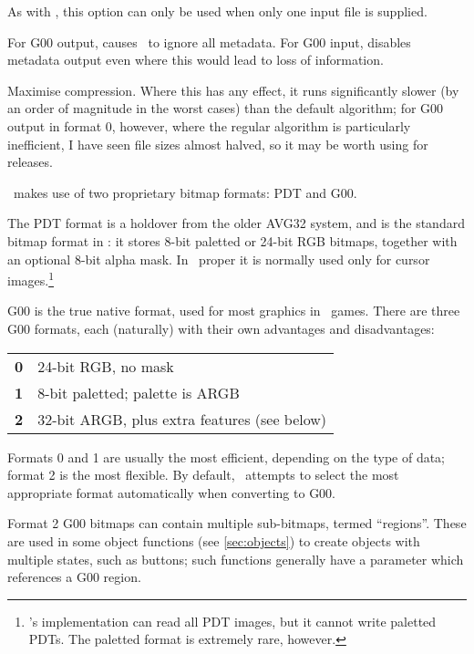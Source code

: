 \begin{nicelist}
    As with , this option can only be used when only one input file is
    supplied.
  \item[\clboth{q}{no-metadata}]
    For G00 output, causes \converter\ to ignore all metadata.  For G00 input,
    disables metadata output even where this would lead to loss of information.
  \item[\clboth{b}{best}]
    Maximise compression.  Where this has any effect, it runs significantly
    slower (by an order of magnitude in the worst cases) than the default
    algorithm; for G00 output in format 0, however, where the regular algorithm
    is particularly inefficient, I have seen file sizes almost halved, so it may
    be worth using for releases.
  \end{nicelist}

  \label{sec:bmpformats}

    \reallive\ makes use of two proprietary bitmap formats: PDT and G00.

    The PDT format is a holdover from the older AVG32 system, and is the
    standard bitmap format in \avgns: it stores 8-bit paletted or 24-bit RGB
    bitmaps, together with an optional 8-bit alpha mask.  In \reallive\ proper
    it is normally used only for cursor images.\footnote{\converter's
    implementation can read all PDT images, but it cannot write paletted PDTs.
    The paletted format is extremely rare, however.}

    G00 is the true native format, used for most graphics in \reallive\ games.
    There are three G00 formats, each (naturally) with their own advantages
    and disadvantages:

    \begin{tabular}{r@{\hs}l}
    \textbf{0} & 24-bit RGB, no mask \\
    \textbf{1} & 8-bit paletted; palette is ARGB \\
    \textbf{2} & 32-bit ARGB, plus extra features (see below)
    \end{tabular}

    \noindent Formats 0 and 1 are usually the most efficient, depending on the
    type of data; format 2 is the most flexible.  By default, \converter\ attempts
    to select the most appropriate format automatically when converting to G00.

  \label{sec:advancedg00}

    Format 2 G00 bitmaps can contain multiple sub-bitmaps, termed ``regions''.
    These are used in some object functions (see \ref{sec:objects}) to create
    objects with multiple states, such as buttons; such functions generally have
    a parameter  which references a G00 region.

